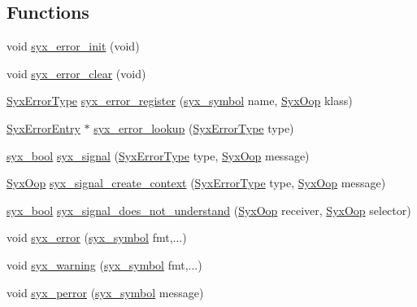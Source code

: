 \subsection*{Functions}
\begin{CompactItemize}
\item 
void \hyperlink{syx-error_8c_10bc732864cef02c21c3956aa28cb7a5}{syx\_\-error\_\-init} (void)
\item 
void \hyperlink{syx-error_8c_0b7d5b2e98bf782f1ae853345938c529}{syx\_\-error\_\-clear} (void)
\item 
\hyperlink{syx-error_8h_514c3f7a5b2ca79dc0d2ba5e1464a36e}{SyxErrorType} \hyperlink{syx-error_8c_8bfbf6b690f699fb8e74ab4d0b48fc32}{syx\_\-error\_\-register} (\hyperlink{syx-types_8h_9663af54b7b72f5d8be5f754ef356525}{syx\_\-symbol} name, \hyperlink{syx-types_8h_1121caba2d40b2ce090b640762744ccd}{SyxOop} klass)
\item 
\hyperlink{struct_syx_error_entry}{SyxErrorEntry} $\ast$ \hyperlink{syx-error_8c_0917cc39dfeb4a377f015a0c7a28fe10}{syx\_\-error\_\-lookup} (\hyperlink{syx-error_8h_514c3f7a5b2ca79dc0d2ba5e1464a36e}{SyxErrorType} type)
\item 
\hyperlink{syx-types_8h_c6dc09b276b99fa1956364359139daab}{syx\_\-bool} \hyperlink{syx-error_8c_0b4ecf0c440811157a5bc63545665742}{syx\_\-signal} (\hyperlink{syx-error_8h_514c3f7a5b2ca79dc0d2ba5e1464a36e}{SyxErrorType} type, \hyperlink{syx-types_8h_1121caba2d40b2ce090b640762744ccd}{SyxOop} message)
\item 
\hyperlink{syx-types_8h_1121caba2d40b2ce090b640762744ccd}{SyxOop} \hyperlink{syx-error_8c_94600ae5844a012288943b78c0d1fc6c}{syx\_\-signal\_\-create\_\-context} (\hyperlink{syx-error_8h_514c3f7a5b2ca79dc0d2ba5e1464a36e}{SyxErrorType} type, \hyperlink{syx-types_8h_1121caba2d40b2ce090b640762744ccd}{SyxOop} message)
\item 
\hyperlink{syx-types_8h_c6dc09b276b99fa1956364359139daab}{syx\_\-bool} \hyperlink{syx-error_8c_8211271c20a9e598b2c395b60bd892a0}{syx\_\-signal\_\-does\_\-not\_\-understand} (\hyperlink{syx-types_8h_1121caba2d40b2ce090b640762744ccd}{SyxOop} receiver, \hyperlink{syx-types_8h_1121caba2d40b2ce090b640762744ccd}{SyxOop} selector)
\item 
void \hyperlink{syx-error_8c_611db78bd74a63c244274e1af9426c2f}{syx\_\-error} (\hyperlink{syx-types_8h_9663af54b7b72f5d8be5f754ef356525}{syx\_\-symbol} fmt,...)
\item 
void \hyperlink{syx-error_8c_d59b90d0a65496b7c93929d6b767b391}{syx\_\-warning} (\hyperlink{syx-types_8h_9663af54b7b72f5d8be5f754ef356525}{syx\_\-symbol} fmt,...)
\item 
void \hyperlink{syx-error_8c_fa1c783d0fae07f610888805115a6733}{syx\_\-perror} (\hyperlink{syx-types_8h_9663af54b7b72f5d8be5f754ef356525}{syx\_\-symbol} message)
\end{CompactItemize}


